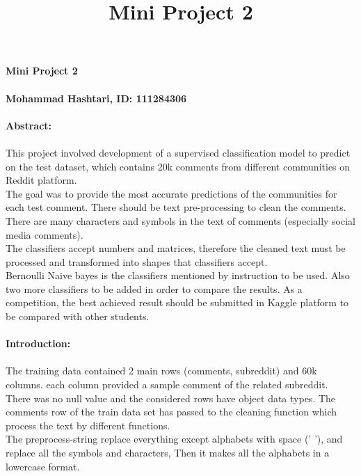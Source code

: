 \documentclass[12pt]{report}
\begin{document}
	\title{Mini Project 2}
	
	\paragraph[]{Mini Project 2}
	\paragraph[]{}
	\textbf{Mohammad Hashtari, ID: 111284306}
	
	\paragraph[]{}
	\paragraph[]{}
	\paragraph{Abstract:}
	\paragraph{}
	This project involved development of a supervised classification model to predict on the test dataset, which contains 20k comments from different communities on Reddit platform.\\
	The goal was to provide the most accurate predictions of the communities for each test comment.
	There should be text pre-processing to clean the comments. There are many characters and symbols in the text of comments (especially  social media comments).\\
	The classifiers accept numbers and matrices, therefore the cleaned text must be processed and transformed into shapes that classifiers accept. \\
	Bernoulli Naive bayes is the classifiers mentioned by instruction to be used.
	Also two more classifiers to be added in order to compare the results.  
	As a competition, the best achieved result should be submitted in Kaggle platform to be compared with other students. 
	
	
	
	\paragraph{Introduction:}
	\paragraph{}
	The training data contained 2 main rows (comments, subreddit) and 60k columns. each column provided a sample comment of the related subreddit.\\
	There was no null value and the considered rows have object data types.
	The comments row of the train data set has passed to the cleaning function which process the text by different functions.\\
	The preprocess-string replace everything except alphabets with space (' '), and replace all the symbols and characters, Then it makes all the alphabets in a lowercase format. \\
	
\end{document}
